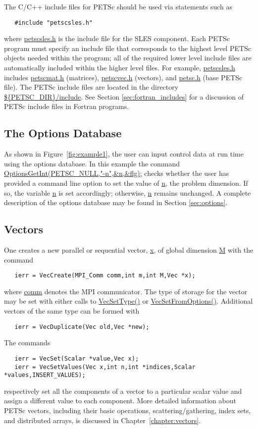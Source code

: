 The C/C++ include files for PETSc should be used via statements such as
\begin{verbatim}
   #include "petscsles.h"
\end{verbatim}
where \url{petscsles.h} is the include file for the SLES component.
Each PETSc program must specify an
include file that corresponds to the highest level PETSc objects
needed within the program; all of the required lower level include
files are automatically included within the higher level files.  For
example, \url{petscsles.h} includes \url{petscmat.h} (matrices),
\url{petscvec.h} (vectors), and \url{petsc.h} (base PETSc file).  
The PETSc include files are located in the directory 
\url{${PETSC_DIR}/include}.  See Section \ref{sec:fortran_includes}
for a discussion of PETSc include files in Fortran programs.

\subsection*{The Options Database}

As shown in Figure~\ref{fig:example1}, the user can input control data
at run time using the options database. In this example the command
\url{OptionsGetInt(PETSC_NULL,"-n",&n,&flg);} checks whether the user has
provided a command line option to set the value of \url{n}, the
problem dimension.  If so, the variable \url{n} is set accordingly;
otherwise, \url{n} remains unchanged. A complete description of the
options database may be found in Section \ref{sec:options}.

\subsection*{Vectors}
\label{sec:vecintro}

One creates a new parallel or 
sequential vector, \url{x}, of global dimension \url{M} with the 
command  
\begin{verbatim}
   ierr = VecCreate(MPI_Comm comm,int m,int M,Vec *x);
\end{verbatim}
where \url{comm} denotes the MPI communicator. The type of storage
for the vector may be set with either calls to 
\url{VecSetType()} or \url{VecSetFromOptions()}.  
Additional vectors of the same type can be formed with
\begin{verbatim}
   ierr = VecDuplicate(Vec old,Vec *new);
\end{verbatim}
The commands  
\begin{verbatim}
   ierr = VecSet(Scalar *value,Vec x);
   ierr = VecSetValues(Vec x,int n,int *indices,Scalar *values,INSERT_VALUES);
\end{verbatim}
respectively set all the components of a vector to a particular scalar
value and assign a different value to each component.  More
detailed information about PETSc vectors, including their basic
operations, scattering/gathering, index sets, and distributed arrays, is
discussed in Chapter~\ref{chapter:vectors}.

